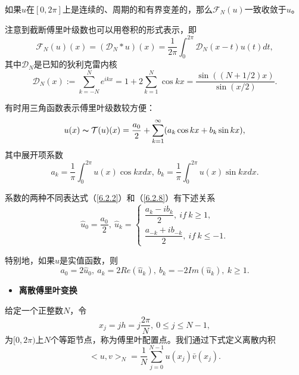     如果$u$在$[0,2\pi]$上是连续的、周期的和有界变差的，那么$\mathcal{F}_N(u)$一致收敛于$u$。
    
    注意到截断傅里叶级数也可以用卷积的形式表示，即    
\begin{equation}
    \mathcal{F}_N(u)(x) = (\mathcal{D}_N * u)(x) = \dfrac{1}{2\pi} \int_0^{2\pi} \mathcal{D}_N(x - t)u(t) dt,
\label{6.2.6}
\end{equation}    
    其中$\mathcal{D}_N$是已知的狄利克雷内核    
\begin{equation}
    \mathcal{D}_N(x) := \sum_{k = -N}^N e^{ikx} = 1 + 2\sum_{k = 1}^N \cos kx = \dfrac{\sin ((N + 1/2)x)}{\sin (x/2)}.
    \label{6.2.7}
\end{equation}    

    有时用三角函数表示傅里叶级数较方便：   
\begin{equation}
    u(x) \thicksim \mathcal{T}(u)(x) = \dfrac{a_0}{2} + \sum_{k = 1}^{\infty} (a_k\cos kx + b_k\sin kx),
    \label{6.2.8}
\end{equation}    
    其中展开项系数    
\begin{equation*}
    a_k = \dfrac{1}{\pi} \int_0^{2\pi} u(x)\cos kx dx, \  b_k = \dfrac{1}{\pi} \int_0^{2\pi} u(x)\sin kx dx.
\end{equation*}    

    系数的两种不同表达式（\ref{6.2.2}）和（\ref{6.2.8}）有下述关系    
\begin{equation}
    \hat{u}_0 = \dfrac{a_0}{2}, \  \hat{u}_k = 
    \left\{
    \begin{array}{l}
        \dfrac{a_k - ib_k}{2}, \   if \   k\geq  1, \\
          \dfrac{a_{-k} + ib_{-k}}{2}, \   if \    k\leq -1.    
    \end{array}
    \right.  
    \label{6.2.9}
\end{equation}    

    特别地，如果$u$是实值函数，则    
\begin{equation}
    a_0 = 2\hat{u}_0, \   a_k = 2Re(\hat{u}_k), \   b_k = -2Im(\hat{u}_k), \   k\geq 1.
    \label{6.2.10}
\end{equation}    

\begin{itemize}
    \item  \textbf{离散傅里叶变换}
\end{itemize}

    给定一个正整数$N$，令
\begin{equation}
    x_j = jh = j\dfrac{2\pi}{N}, \   0\leq j\leq N-1,
    \label{6.2.11}
\end{equation}
    为$[0,2\pi)$上$N$个等距节点，称为傅里叶配置点。我们通过下式定义离散内积   
\begin{equation}
    <u,v>_N = \dfrac{1}{N} \sum_{j = 0}^{N-1} u(x_j)\bar{v}(x_j).
\end{equation}    


